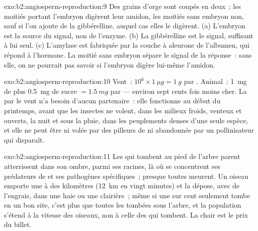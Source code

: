 \begin{solution}{exo:b2:angiosperm-reproduction:9}
Des grains d'orge sont coupés en deux~; les moitiés portant l'embryon
digèrent leur amidon, les moitiés sans embryon non, sauf si l'on ajoute
de la gibbérelline, auquel cas elles le digèrent. (a) L'embryon est la
source du signal, non de l'enzyme. (b) La gibbérelline est le signal,
suffisant à lui seul. (c) L'amylase est fabriquée par la couche à
aleurone de l'albumen, qui répond à l'hormone. La moitié sans embryon
sépare le signal de la réponse~: sans elle, on ne pourrait pas savoir si
l'embryon digère lui-même l'amidon.
\end{solution}

\begin{solution}{exo:b2:angiosperm-reproduction:10}
Vent~: $10^{6}\times\qty{1}{\micro g} = \qty{1}{g}$ par . Animal~:
\qty{1}{mg} de  plus \qty{0.5}{mg} de sucre $= \qty{1.5}{mg}$
par  --- environ sept cents fois moins cher. La  par
le vent n'a besoin d'aucun partenaire~: elle fonctionne au début du
printemps, avant que les insectes ne volent, dans les milieux froids,
venteux et ouverts, la nuit et sous la pluie, dans les peuplements
denses d'une seule espèce, et elle ne peut être ni volée par des
pilleurs de  ni abandonnée par un pollinisateur qui disparaît.
\end{solution}

\begin{solution}{exo:b2:angiosperm-reproduction:11}
Les  qui tombent au pied de l'arbre parent atterrissent dans son
ombre, parmi ses racines, là où se concentrent ses prédateurs de 
et ses pathogènes spécifiques~; presque toutes meurent. Un oiseau
emporte une  à des kilomètres (\qty{12}{km} en vingt minutes) et
la dépose, avec de l'engrais, dans une haie ou une clairière~; même si
une  sur cent seulement tombe en un bon site, c'est plus que
toutes les  tombées sous l'arbre, et la population s'étend à la
vitesse des oiseaux, non à celle des  qui tombent. La chair est le
prix du billet.
\end{solution}

